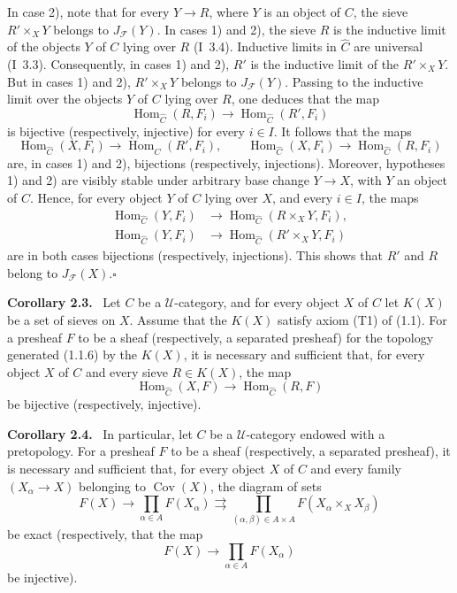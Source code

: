 \documentclass[11pt]{article}
\newcommand{\U}{\mathcal{U}}
\newcommand{\Hom}{\operatorname{Hom}}
\newcommand{\Cov}{\operatorname{Cov}}
\newcommand{\whC}{\widehat{C}}
\newcommand{\Fcal}{\mathcal{F}}
\newcommand{\qedtext}{\hfill\(\square\)}
\newenvironment{statement}[1]{\par\medskip\noindent\textbf{#1.}\ }{\par\medskip}
\begin{document}
In case 2), note that for every \(Y\to R\), where \(Y\) is an object of \(C\), the sieve \(R'\times_XY\) belongs to \(J_{\Fcal}(Y)\). In cases 1) and 2), the sieve \(R\) is the inductive limit of the objects \(Y\) of \(C\) lying over \(R\) (I~3.4). Inductive limits in \(\whC\) are universal (I~3.3). Consequently, in cases 1) and 2), \(R'\) is the inductive limit of the \(R'\times_XY\). But in cases 1) and 2), \(R'\times_XY\) belongs to \(J_{\Fcal}(Y)\). Passing to the inductive limit over the objects \(Y\) of \(C\) lying over \(R\), one deduces that the map
\[
\Hom_{\whC}(R,F_i)\longrightarrow \Hom_{\whC}(R',F_i)
\]
is bijective (respectively, injective) for every \(i\in I\). It follows that the maps
\[
\Hom_{\whC}(X,F_i)\longrightarrow \Hom_{\whC}(R',F_i),
\qquad
\Hom_{\whC}(X,F_i)\longrightarrow \Hom_{\whC}(R,F_i)
\]
are, in cases 1) and 2), bijections (respectively, injections). Moreover, hypotheses 1) and 2) are visibly stable under arbitrary base change \(Y\to X\), with \(Y\) an object of \(C\). Hence, for every object \(Y\) of \(C\) lying over \(X\), and every \(i\in I\), the maps
\begin{align*}
\Hom_{\whC}(Y,F_i)&\longrightarrow \Hom_{\whC}(R\times_XY,F_i),\\
\Hom_{\whC}(Y,F_i)&\longrightarrow \Hom_{\whC}(R'\times_XY,F_i)
\end{align*}
are in both cases bijections (respectively, injections). This shows that \(R'\) and \(R\) belong to \(J_{\Fcal}(X)\).\qedtext

\begin{statement}{Corollary 2.3}
Let \(C\) be a \(\U\)-category, and for every object \(X\) of \(C\) let \(K(X)\) be a set of sieves on \(X\). Assume that the \(K(X)\) satisfy axiom (T1) of (1.1). For a presheaf \(F\) to be a sheaf (respectively, a separated presheaf) for the topology generated (1.1.6) by the \(K(X)\), it is necessary and sufficient that, for every object \(X\) of \(C\) and every sieve \(R\in K(X)\), the map
\[
\Hom_{\whC}(X,F)\longrightarrow \Hom_{\whC}(R,F)
\]
be bijective (respectively, injective).
\end{statement}

\begin{statement}{Corollary 2.4}
In particular, let \(C\) be a \(\U\)-category endowed with a pretopology. For a presheaf \(F\) to be a sheaf (respectively, a separated presheaf), it is necessary and sufficient that, for every object \(X\) of \(C\) and every family \((X_\alpha\to X)\) belonging to \(\Cov(X)\), the diagram of sets
\[
F(X)\longrightarrow \prod_{\alpha\in A}F(X_\alpha)\rightrightarrows
\prod_{(\alpha,\beta)\in A\times A}F(X_\alpha\times_XX_\beta)
\]
be exact (respectively, that the map
\[
F(X)\longrightarrow \prod_{\alpha\in A}F(X_\alpha)
\]
be injective).
\end{statement}
\end{document}
